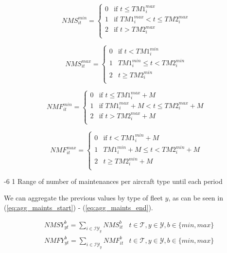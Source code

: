 \documentclass[a4paper,onecolumn,fleqn]{article}
\makeatletter
\renewcommand\section{\@startsection{section}{1}{\z@}%
                       {-6\p@ \@plus -0\p@ \@minus -0\p@}%
                       {2\p@ \@plus 0\p@ \@minus 0\p@}%
                       {\normalsize\textbf}}
\renewcommand\section{\@startsection{section}{2}{\z@}%
                       {-6\p@ \@plus -0\p@ \@minus -0\p@}%
                       {2\p@ \@plus 0\p@ \@minus 0\p@}%
                       {\normalsize\textbf}}
\renewcommand\section{\@startsection{section}{3}{\z@}%
                       {-6\p@ \@plus -0\p@ \@minus -0\p@}%
                       {1\p@ \@plus 0\p@ \@minus 0\p@}%
                       {\normalsize\itshape\bfseries}}
\makeatother
\begin{document}
\begin{multicols}{2}
\[
 NMS^{min}_{it} = 
  \begin{cases} 
   0 & \text{if } t \le TM1^{max}_i\\
   1 & \text{if } TM1^{max}_i < t \le TM2^{max}_i \\
   2 & \text{if } t > TM2^{max}_i \\
  \end{cases}
\]

\[
 NMS^{max}_{it} = 
  \begin{cases} 
   0 & \text{if } t < TM1^{min}_i \\
   1 & TM1^{min}_i \le t < TM2^{min}_i \\
   2 & t \ge TM2^{min}_i \\
  \end{cases}
\]

\columnbreak

\[
 NMF^{min}_{it} = 
  \begin{cases} 
   0 & \text{if } t \le TM1^{max}_i + M\\
   1 & \text{if } TM1^{max}_i + M< t \le TM2^{max}_i + M\\
   2 & \text{if } t > TM2^{max}_i + M \\
  \end{cases}
\]

\[
 NMF^{max}_{it} = 
  \begin{cases} 
   0 & \text{if } t < TM1^{min}_i + M\\
   1 & TM1^{min}_i + M \le t < TM2^{min}_i + M\\
   2 & t \ge TM2^{min}_i + M\\
  \end{cases}
\]

\end{multicols}

\section{Range of number of maintenances per aircraft type until each period}

We can aggregate the previous values by type of fleet $y$, as can be seen in (\ref{eq:agg_maints_start}) - (\ref{eq:agg_maints_end}).

\begin{align}
  & NMSY^{b}_{yt} = \sum_{i \in \mathcal{IY}_y} NMS^{b}_{it} 
      & t \in \mathcal{T}, y \in \mathcal{Y}, b \in \{min, max\} \label{eq:agg_maints_start} \\
  & NMFY^{b}_{yt} = \sum_{i \in \mathcal{IY}_y} NMF^{b}_{it} 
      & t \in \mathcal{T}, y \in \mathcal{Y}, b \in \{min, max\} \label{eq:agg_maints_end}
\end{align}
\end{document}
